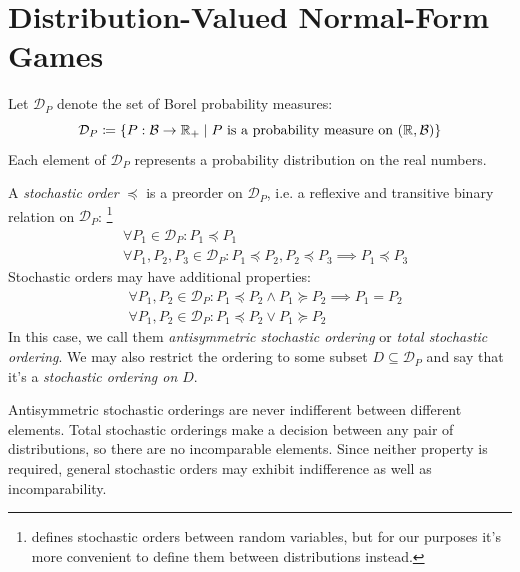 \documentclass[a4paper]{scrreprt}
\newcommand{\Rp}{\mathbb{R}_+}
\newcommand{\B}{\mathcal{B}}
\newcommand{\D}{\mathcal{D}}
\begin{document}
    \section{Distribution-Valued Normal-Form Games}
    \label{sec:distributionValuedNormalFormGames}
    \newcommand{\DP}{\D_P} %
    
    Let $\DP$ denote the set of Borel probability measures:
    \[ \DP \coloneqq \set{P: \B \to \Rp \mid P \text{ is a probability measure on } (\R, \B)} \]
    Each element of $\DP$ represents a probability distribution on the real numbers.
    
    \let\dleq\preccurlyeq
    \let\dgeq\succcurlyeq
    \let\dless\prec
    \let\dgreater\succ
    
    \newcommand{\leqE}{\dleq_E}
    \newcommand{\leqst}{\dleq_{\text{st}}}
    \newcommand{\leqtail}{\dleq_{\text{tail}}}
    \newcommand{\lesstail}{\dless_{\text{tail}}}
    \newcommand{\greatertail}{\dgreater_{\text{tail}}}
    \newcommand{\leqRlex}{\leq_{\textsc{Rlex}}}
    \newcommand{\lessRlex}{<_{\textsc{Rlex}}}
    \newcommand{\geqRlex}{\geq_{\textsc{Rlex}}}
    \newcommand{\greaterRlex}{>_{\textsc{Rlex}}}
    
    \begin{defn}[Stochastic Order]
        A \emph{stochastic order} $\dleq$ is a preorder on $\DP$, i.e. a reflexive and transitive binary relation on $\DP$:
        \footnote{\cite{bib:shakedStochasticOrders} defines stochastic orders between random variables, but for our purposes it's more convenient to define them between distributions instead.}
        \begin{align*}
            &\forall P_1 \in \DP: P_1 \dleq P_1 \tag{Reflexivity} \\
            &\forall P_1, P_2, P_3 \in \DP: P_1 \dleq P_2, P_2 \dleq P_3 \implies P_1 \dleq P_3 \tag{Transitivity}
        \end{align*}
        Stochastic orders may have additional properties:
        \begin{align*}
            &\forall P_1, P_2 \in \DP: P_1 \dleq P_2 \wedge P_1 \dgeq P_2 \implies P_1 = P_2 \tag{Antisymmetry} \\
            &\forall P_1, P_2 \in \DP: P_1 \dleq P_2 \vee P_1 \dgeq P_2 \tag{Totality}
        \end{align*}
        In this case, we call them \emph{antisymmetric stochastic ordering} or \emph{total stochastic ordering}.
        We may also restrict the ordering to some subset $D \subseteq \DP$ and say that it's a \emph{stochastic ordering on $D$}.
    \end{defn}
    Antisymmetric stochastic orderings are never indifferent between different elements. Total stochastic orderings make a decision between any pair of distributions, so there are no incomparable elements. Since neither property is required, general stochastic orders may exhibit indifference as well as incomparability.
    
\end{document}
